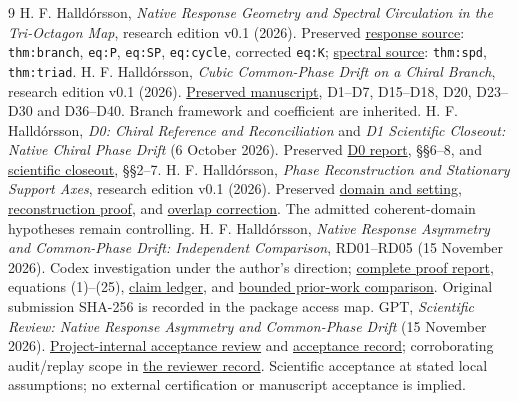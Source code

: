 \begin{thebibliography}{9}
 H. F. Halld\'orsson, \emph{Native Response Geometry and Spectral Circulation in the Tri-Octagon Map}, research edition v0.1 (2026). Preserved \href{evidence/accepted/submitted/sources/inherited/NRG/response.tex}{response source}: \texttt{thm:branch}, \texttt{eq:P}, \texttt{eq:SP}, \texttt{eq:cycle}, corrected \texttt{eq:K}; \href{evidence/accepted/submitted/sources/inherited/NRG/spectral.tex}{spectral source}: \texttt{thm:spd}, \texttt{thm:triad}.
 H. F. Halld\'orsson, \emph{Cubic Common-Phase Drift on a Chiral Branch}, research edition v0.1 (2026). \href{evidence/accepted/submitted/sources/inherited/drift.tex}{Preserved manuscript}, D1--D7, D15--D18, D20, D23--D30 and D36--D40. Branch framework and coefficient are inherited.
 H. F. Halld\'orsson, \emph{D0: Chiral Reference and Reconciliation} and \emph{D1 Scientific Closeout: Native Chiral Phase Drift} (6 October 2026). Preserved \href{evidence/accepted/submitted/sources/inherited/D0.md}{D0 report}, \S\S6--8, and \href{evidence/accepted/submitted/sources/inherited/D1_CLOSEOUT.md}{scientific closeout}, \S\S2--7.
 H. F. Halld\'orsson, \emph{Phase Reconstruction and Stationary Support Axes}, research edition v0.1 (2026). Preserved \href{evidence/accepted/submitted/sources/inherited/phase/setting.tex}{domain and setting}, \href{evidence/accepted/submitted/sources/inherited/phase/reconstruction.tex}{reconstruction proof}, and \href{evidence/accepted/submitted/sources/inherited/phase/overlap.tex}{overlap correction}. The admitted coherent-domain hypotheses remain controlling.
 H. F. Halld\'orsson, \emph{Native Response Asymmetry and Common-Phase Drift: Independent Comparison}, RD01--RD05 (15 November 2026). Codex investigation under the author's direction; \href{evidence/accepted/submitted/PROOF_REPORT.md}{complete proof report}, equations (1)--(25), \href{evidence/accepted/submitted/CLAIM_LEDGER.json}{claim ledger}, and \href{evidence/accepted/submitted/PRIOR_WORK_COMPARISON.md}{bounded prior-work comparison}. Original submission SHA-256 is recorded in the package access map.
 GPT, \emph{Scientific Review: Native Response Asymmetry and Common-Phase Drift} (15 November 2026). \href{evidence/accepted/NATIVE_RESPONSE_DRIFT_CORRESPONDENCE_01_GPT_REVIEW.md}{Project-internal acceptance review} and \href{evidence/accepted/GPT_ACCEPTANCE.json}{acceptance record}; corroborating audit/replay scope in \href{evidence/accepted/reviewer/AUDIT_AND_REPLAY.json}{the reviewer record}. Scientific acceptance at stated local assumptions; no external certification or manuscript acceptance is implied.
\end{thebibliography}
